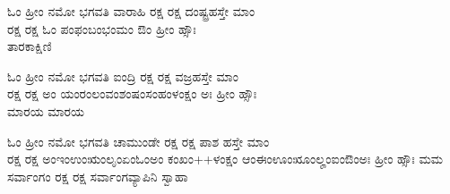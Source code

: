 ಓಂ ಹ್ರೀಂ ನಮೋ ಭಗವತಿ ವಾರಾಹಿ ರಕ್ಷ ರಕ್ಷ ದಂಷ್ಟ್ರಹಸ್ತೇ ಮಾಂ\\ ರಕ್ಷ ರಕ್ಷ ಓಂ ಪಂಫಂಬಂಭಂಮಂ ಔಂ ಹ್ರೀಂ ಹ್ಸೌಃ\\ ತಾರಕಾಕ್ಷಿಣಿ 

ಓಂ ಹ್ರೀಂ ನಮೋ ಭಗವತಿ ಐಂದ್ರಿ ರಕ್ಷ ರಕ್ಷ ವಜ್ರಹಸ್ತೇ ಮಾಂ\\ ರಕ್ಷ ರಕ್ಷ ಅಂ ಯಂರಂಲಂವಂಶಂಷಂಸಂಹಂಳಂಕ್ಷಂ ಅಃ  ಹ್ರೀಂ ಹ್ಸೌಃ \\ಮಾರಯ ಮಾರಯ 

ಓಂ ಹ್ರೀಂ ನಮೋ ಭಗವತಿ ಚಾಮುಂಡೇ ರಕ್ಷ ರಕ್ಷ ಪಾಶ ಹಸ್ತೇ ಮಾಂ\\ ರಕ್ಷ ರಕ್ಷ  ಅಂಇಂಉಂಋಂಲೃಂಏಂಓಂಅಂ ಕಂಖಂ++ಳಂಕ್ಷಂ ಆಂಈಂಊಂೠಂಲೄಂಐಂಔಂಅಃ  ಹ್ರೀಂ ಹ್ಸೌಃ ಮಮ ಸರ್ವಾಂಗಂ ರಕ್ಷ ರಕ್ಷ ಸರ್ವಾಂಗವ್ಯಾಪಿನಿ ಸ್ವಾಹಾ 


